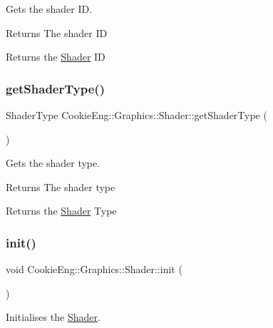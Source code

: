 Gets the shader ID. 

\begin{DoxyReturn}{Returns}
The shader ID
\end{DoxyReturn}
Returns the \hyperlink{class_cookie_eng_1_1_graphics_1_1_shader}{Shader} ID \mbox{\label{class_cookie_eng_1_1_graphics_1_1_shader_adde0294c86137d22a247bd011b8e40c8}} 
\subsubsection{\texorpdfstring{get\+Shader\+Type()}{getShaderType()}}
{\footnotesize\ttfamily Shader\+Type Cookie\+Eng\+::\+Graphics\+::\+Shader\+::get\+Shader\+Type (\begin{DoxyParamCaption}{ }\end{DoxyParamCaption})\hspace{0.3cm}{\ttfamily [inline]}}



Gets the shader type. 

\begin{DoxyReturn}{Returns}
The shader type
\end{DoxyReturn}
Returns the \hyperlink{class_cookie_eng_1_1_graphics_1_1_shader}{Shader} Type \mbox{\label{class_cookie_eng_1_1_graphics_1_1_shader_ae591a7107e04f835f1f8dbc42e0035c6}} 
\subsubsection{\texorpdfstring{init()}{init()}}
{\footnotesize\ttfamily void Cookie\+Eng\+::\+Graphics\+::\+Shader\+::init (\begin{DoxyParamCaption}{ }\end{DoxyParamCaption})\hspace{0.3cm}{\ttfamily [protected]}}



Initialises the \hyperlink{class_cookie_eng_1_1_graphics_1_1_shader}{Shader}. 

